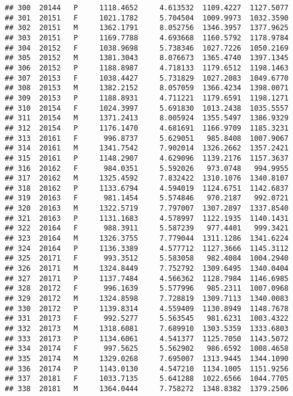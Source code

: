 \documentclass[]{article}
\begin{document}
\begin{verbatim}
## 300  20144   P     1118.4652     4.613532  1109.4227  1127.5077
## 301  20151   F     1021.1782     5.704504  1009.9973  1032.3590
## 302  20151   M     1362.1791     8.052756  1346.3957  1377.9625
## 303  20151   P     1169.7788     4.693668  1160.5792  1178.9784
## 304  20152   F     1038.9698     5.738346  1027.7226  1050.2169
## 305  20152   M     1381.3043     8.076673  1365.4740  1397.1345
## 306  20152   P     1188.8987     4.718133  1179.6512  1198.1463
## 307  20153   F     1038.4427     5.731829  1027.2083  1049.6770
## 308  20153   M     1382.2152     8.057059  1366.4234  1398.0071
## 309  20153   P     1188.8931     4.711221  1179.6591  1198.1271
## 310  20154   F     1024.3997     5.691830  1013.2438  1035.5557
## 311  20154   M     1371.2413     8.005924  1355.5497  1386.9329
## 312  20154   P     1176.1470     4.681691  1166.9709  1185.3231
## 313  20161   F      996.8737     5.629051   985.8408  1007.9067
## 314  20161   M     1341.7542     7.902014  1326.2662  1357.2421
## 315  20161   P     1148.2907     4.629096  1139.2176  1157.3637
## 316  20162   F      984.0351     5.592026   973.0748   994.9955
## 317  20162   M     1325.4592     7.832422  1310.1076  1340.8107
## 318  20162   P     1133.6794     4.594019  1124.6751  1142.6837
## 319  20163   F      981.1454     5.574846   970.2187   992.0721
## 320  20163   M     1322.5719     7.797007  1307.2897  1337.8540
## 321  20163   P     1131.1683     4.578997  1122.1935  1140.1431
## 322  20164   F      988.3911     5.587239   977.4401   999.3421
## 323  20164   M     1326.3755     7.779044  1311.1286  1341.6224
## 324  20164   P     1136.3389     4.577712  1127.3666  1145.3112
## 325  20171   F      993.3512     5.583058   982.4084  1004.2940
## 326  20171   M     1324.8449     7.752792  1309.6495  1340.0404
## 327  20171   P     1137.7484     4.566362  1128.7984  1146.6985
## 328  20172   F      996.1639     5.577996   985.2311  1007.0968
## 329  20172   M     1324.8598     7.728819  1309.7113  1340.0083
## 330  20172   P     1139.8314     4.559409  1130.8949  1148.7678
## 331  20173   F      992.5277     5.563545   981.6231  1003.4322
## 332  20173   M     1318.6081     7.689910  1303.5359  1333.6803
## 333  20173   P     1134.6061     4.541377  1125.7050  1143.5072
## 334  20174   F      997.5625     5.562902   986.6592  1008.4658
## 335  20174   M     1329.0268     7.695007  1313.9445  1344.1090
## 336  20174   P     1143.0130     4.547210  1134.1005  1151.9256
## 337  20181   F     1033.7135     5.641288  1022.6566  1044.7705
## 338  20181   M     1364.0444     7.758272  1348.8382  1379.2506

\end{verbatim}
\end{document}
